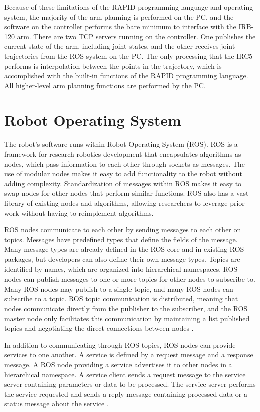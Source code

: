 \documentclass[]{cwru} %
\begin{document}
Because of these limitations of the RAPID programming language and
operating system, the majority of the arm planning is performed on the
PC, and the software on the controller performs the bare minimum to
interface with the IRB-120 arm. There are two TCP servers running on the
controller. One publishes the current state of the arm, including joint
states, and the other receives joint trajectories from the ROS system on
the PC. The only processing that the IRC5 performs is interpolation
between the points in the trajectory, which is accomplished with the
built-in functions of the RAPID programming language. All higher-level
arm planning functions are performed by the PC.

\section{Robot Operating System}

The robot's software runs within Robot Operating System (ROS). ROS is a
framework for research robotics development that encapsulates algorithms
as nodes, which pass information to each other through sockets as
messages. The use of modular nodes makes it easy to add functionality to
the robot without adding complexity. Standardization of messages within
ROS makes it easy to swap nodes for other nodes that perform similar
functions. ROS also has a vast library of existing nodes and algorithms,
allowing researchers to leverage prior work without having to
reimplement algorithms.

ROS nodes communicate to each other by sending messages to each other on
topics. Messages have predefined types that define the fields of the
message. Many message types are already defined in the ROS core and in
existing ROS packages, but developers can also define their own message
types. Topics are identified by names, which are organized into
hierarchical namespaces. ROS nodes can publish messages to one or more
topics for other nodes to subscribe to. Many ROS nodes may publish to a
single topic, and many ROS nodes can subscribe to a topic. ROS topic
communication is distributed, meaning that nodes communicate directly
from the publisher to the subscriber, and the ROS master node only
facilitates this communication by maintaining a list published topics
and negotiating the direct connections between nodes \cite{ros_concepts}.

In addition to communicating through ROS topics, ROS nodes can provide
services to one another. A service is defined by a request message and a
response message. A ROS node providing a service advertises it to other
nodes in a hierarchical namespace. A service client sends a request
message to the service server containing parameters or data to be
processed. The service server performs the service requested and sends a
reply message containing processed data or a status message about the
service \cite{ros_concepts}.
\end{document}
